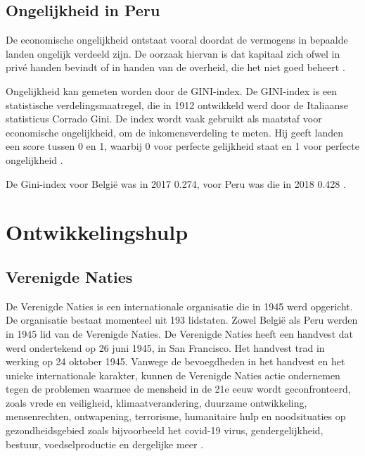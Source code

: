 \subsection{Ongelijkheid in Peru}
De economische ongelijkheid ontstaat vooral doordat de vermogens in bepaalde landen ongelijk verdeeld zijn. De oorzaak hiervan is dat kapitaal zich ofwel in privé handen bevindt of in handen van de overheid, die het niet goed beheert \autocite{Zucman2018}.

Ongelijkheid kan gemeten worden door de GINI-index. De GINI-index is een statistische verdelingsmaatregel, die in 1912 ontwikkeld werd door de Italiaanse statisticus Corrado Gini. De index wordt vaak gebruikt als maatstaf voor economische ongelijkheid, om de inkomensverdeling te meten. Hij geeft landen een score tussen 0 en 1, waarbij 0 voor perfecte gelijkheid staat en 1 voor perfecte ongelijkheid \autocite{Chappelow2020}.

De Gini-index voor België was in 2017 0.274, voor Peru was die in 2018 0.428 \autocite{Bank2018}.


\section{Ontwikkelingshulp}

\subsection{Verenigde Naties}
De Verenigde Naties is een internationale organisatie die in 1945 werd opgericht. De organisatie bestaat momenteel uit 193 lidstaten. Zowel België als Peru werden in 1945 lid van de Verenigde Naties. De Verenigde Naties heeft een handvest dat werd ondertekend op 26 juni 1945, in San Francisco. Het handvest trad in werking op 24 oktober 1945. Vanwege de bevoegdheden in het handvest en het unieke internationale karakter, kunnen de Verenigde Naties actie ondernemen tegen de problemen waarmee de mensheid in de 21e eeuw wordt geconfronteerd, zoals vrede en veiligheid, klimaatverandering, duurzame ontwikkeling, mensenrechten, ontwapening, terrorisme, humanitaire hulp en noodsituaties op gezondheidsgebied zoals bijvoorbeeld het covid-19 virus, gendergelijkheid, bestuur, voedselproductie en dergelijke meer \autocite{Nations2020}.

